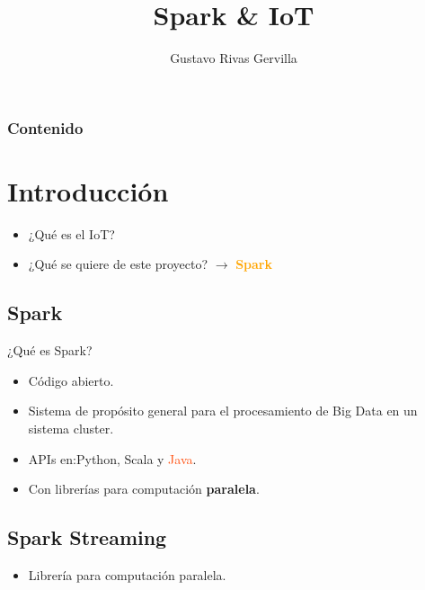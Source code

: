 \documentclass{beamer}
\date{} %
\author{Gustavo Rivas Gervilla}
\title{Spark \& IoT}
\begin{document}
	\begin{frame}[plain]
		\titlepage
	\end{frame}
		
	\begin{frame}
		\frametitle{Contenido}
		\tableofcontents
	\end{frame}
	
	\AtBeginSection[]{
		\begin{frame}
			\frametitle{Contenido}
			\tableofcontents[currentsection]
		\end{frame}
	}
	
	\section{Introducción}
	
	\begin{frame}
		\begin{itemize}
			\item ¿Qué es el IoT?
			\item ¿Qué se quiere de este proyecto? $\longrightarrow$ \textcolor{orange}{\textbf{Spark}}
		\end{itemize}		
	\end{frame}
	
	\subsection{Spark}
	
	\begin{frame}
		¿Qué es Spark?
		\begin{itemize}
			\item Código abierto.
			\item Sistema de propósito general para el procesamiento de Big Data en un sistema cluster.
			\item APIs en:\textcolor{deepBlue}{Py}\textcolor{deepYellow}{thon}, \textcolor{deepRed}{Scala} y \textcolor{orangeRed}{Java}.
			\item Con librerías para computación \textbf{paralela}.
		\end{itemize}
	\end{frame}
	
	\subsection{Spark Streaming}
	
	\begin{frame}
		\begin{itemize}
			\item Librería para computación paralela.
		\end{itemize}
	\end{frame}
	
\end{document}
